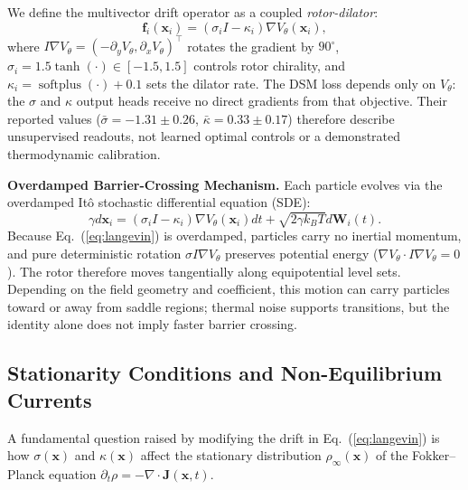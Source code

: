\documentclass{article}
\begin{document}
We define the multivector drift operator as a coupled \textit{rotor-dilator}:
\begin{equation}
\mathbf{f}_i(\mathbf{x}_i) = (\sigma_i I - \kappa_i) \nabla V_\theta(\mathbf{x}_i),
\label{eq:clifford_flow}
\end{equation}
where $I \nabla V_\theta = (-\partial_{y} V_\theta, \partial_{x} V_\theta)^\top$ rotates the gradient by $90^\circ$, $\sigma_i = 1.5 \tanh(\cdot) \in [-1.5, 1.5]$ controls rotor chirality, and $\kappa_i = \operatorname{softplus}(\cdot) + 0.1$ sets the dilator rate. The DSM loss depends only on $V_\theta$: the $\sigma$ and $\kappa$ output heads receive no direct gradients from that objective. Their reported values ($\bar{\sigma}=-1.31\pm0.26$, $\bar{\kappa}=0.33\pm0.17$) therefore describe unsupervised readouts, not learned optimal controls or a demonstrated thermodynamic calibration.

\textbf{Overdamped Barrier-Crossing Mechanism.} Each particle evolves via the overdamped It\^o stochastic differential equation (SDE):
\begin{equation}
\gamma d\mathbf{x}_i = (\sigma_i I - \kappa_i) \nabla V_\theta(\mathbf{x}_i) dt + \sqrt{2 \gamma k_B T} d\mathbf{W}_i(t).
\label{eq:langevin}
\end{equation}
Because Eq.~(\ref{eq:langevin}) is overdamped, particles carry no inertial momentum, and pure deterministic rotation $\sigma I \nabla V_\theta$ preserves potential energy ($\nabla V_\theta \cdot I \nabla V_\theta = 0$). The rotor therefore moves tangentially along equipotential level sets. Depending on the field geometry and coefficient, this motion can carry particles toward or away from saddle regions; thermal noise supports transitions, but the identity alone does not imply faster barrier crossing.

\subsection{Stationarity Conditions and Non-Equilibrium Currents}

A fundamental question raised by modifying the drift in Eq.~(\ref{eq:langevin}) is how $\sigma(\mathbf{x})$ and $\kappa(\mathbf{x})$ affect the stationary distribution $\rho_\infty(\mathbf{x})$ of the Fokker--Planck equation $\partial_t \rho = -\nabla \cdot \mathbf{J}(\mathbf{x}, t)$.
\end{document}
